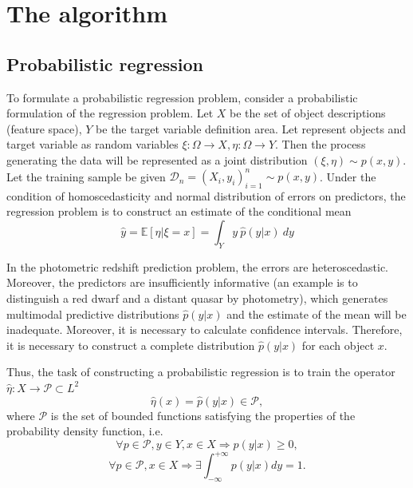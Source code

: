 \documentclass[fleqn,usenatbib]{mnras}
\begin{document}

\section{The algorithm}

\subsection{Probabilistic regression}
To formulate a probabilistic regression problem, consider a probabilistic formulation of the regression problem. Let \(X\) be the set of object descriptions (feature space), \(Y\) be the target variable definition area. Let represent objects and target variable as random variables \(\xi : \Omega \rightarrow X, \eta : \Omega \rightarrow Y \). Then the process generating the data will be represented as a joint distribution \((\xi, \eta) \sim p(x, y)\). Let the training sample be given \(\mathcal{D}_n = (X_i, y_i)_{i=1}^n \sim p(x,y)\). Under the condition of homoscedasticity and normal distribution of errors on predictors, the regression problem is to construct an estimate of the conditional mean
\begin{equation}\label{eq:regr_classic}
     \hat{y} = \mathbb{E}[\eta | \xi = x] = \int_Y y ~ \hat{p}(y|x) ~ dy
\end{equation}

In the photometric redshift prediction problem, the errors are heteroscedastic. Moreover, the predictors are insufficiently informative (an example is to distinguish a red dwarf and a distant quasar by photometry), which generates multimodal predictive distributions $\hat{p}(y|x)$ and the estimate of the mean will be inadequate. Moreover, it is necessary to calculate confidence intervals. Therefore, it is necessary to construct a complete distribution $\hat{p}(y|x)$ for each object $x$.

Thus, the task of constructing a probabilistic regression is to train the operator \(\hat{\eta} : X \rightarrow \mathcal{P} \subset L^2\)
\begin{equation}
    \hat{\eta}(x) = \hat{p}(y|x) \in \mathcal{P},
\end{equation}
where \(\mathcal{P}\) is the set of bounded functions satisfying the properties of the probability density function, i.e.
\begin{equation}
    \forall p \in \mathcal{P}, y \in Y, x \in X \Rightarrow p(y|x) \geq 0,
\end{equation}
\begin{equation}
    \forall p \in \mathcal{P}, x \in X \Rightarrow \exists \int_{-\infty}^{+\infty} p(y|x) dy = 1.
\end{equation}
\end{document}
